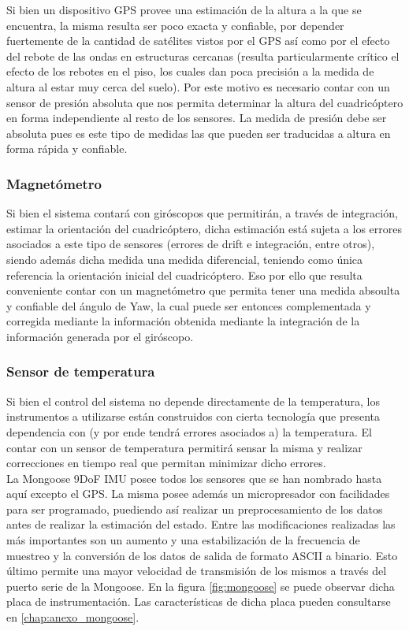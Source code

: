 \documentclass[main]{subfiles}
\begin{document}
Si bien un dispositivo GPS provee una estimaci\'on de la altura a la que se encuentra, la misma resulta ser poco exacta y confiable, por depender fuertemente de la cantidad de sat\'elites vistos por el GPS as\'i como por el efecto del rebote de las ondas en estructuras cercanas (resulta particularmente cr\'itico el efecto de los rebotes en el piso, los cuales dan poca precisi\'on a la medida de altura al estar muy cerca del suelo). Por este motivo es necesario contar con un sensor de presi\'on absoluta que nos permita determinar la altura del cuadric\'optero en forma independiente al resto de los sensores. La medida de presi\'on debe ser absoluta pues es este tipo de medidas las que pueden ser traducidas a altura en forma r\'apida y confiable.

\subsubsection{Magnet\'ometro}

Si bien el sistema contar\'a con gir\'oscopos que permitir\'an, a trav\'es de integraci\'on, estimar la orientaci\'on del cuadric\'optero, dicha estimaci\'on est\'a sujeta a los errores asociados a este tipo de sensores (errores de drift e integraci\'on, entre otros), siendo adem\'as dicha medida una medida diferencial, teniendo como \'unica referencia la orientaci\'on inicial del cuadric\'optero. Eso por ello que resulta conveniente contar con un magnet\'ometro que permita tener una medida absoulta y confiable del \'angulo de Yaw, la cual puede ser entonces complementada y corregida mediante la informaci\'on obtenida mediante la integraci\'on de la informaci\'on generada por el gir\'oscopo.

\subsubsection{Sensor de temperatura}

Si bien el control del sistema no depende directamente de la temperatura, los instrumentos a utilizarse est\'an construidos con cierta tecnolog\'ia que presenta dependencia con (y por ende tendr\'a errores asociados a) la temperatura. El contar con un sensor de temperatura permitir\'a sensar la misma y realizar correcciones en tiempo real que permitan minimizar dicho errores.\\

La Mongoose 9DoF IMU posee todos los sensores que se han nombrado hasta aqu\'i excepto el GPS. La misma posee adem\'as un micropresador con facilidades para ser programado, puediendo as\'i realizar un preprocesamiento de los datos antes de realizar la estimaci\'on del estado. Entre las modificaciones realizadas las m\'as importantes son un aumento y una estabilizaci\'on de la frecuencia de muestreo y la conversi\'on de los datos de salida de formato ASCII a binario. Esto \'ultimo permite una mayor velocidad de transmisi\'on de los mismos a trav\'es del puerto serie de la Mongoose. En la figura \ref{fig:mongoose} se puede observar dicha placa de instrumentaci\'on. Las caracter\'isticas de dicha placa pueden consultarse en \ref{chap:anexo_mongoose}.
\end{document}
